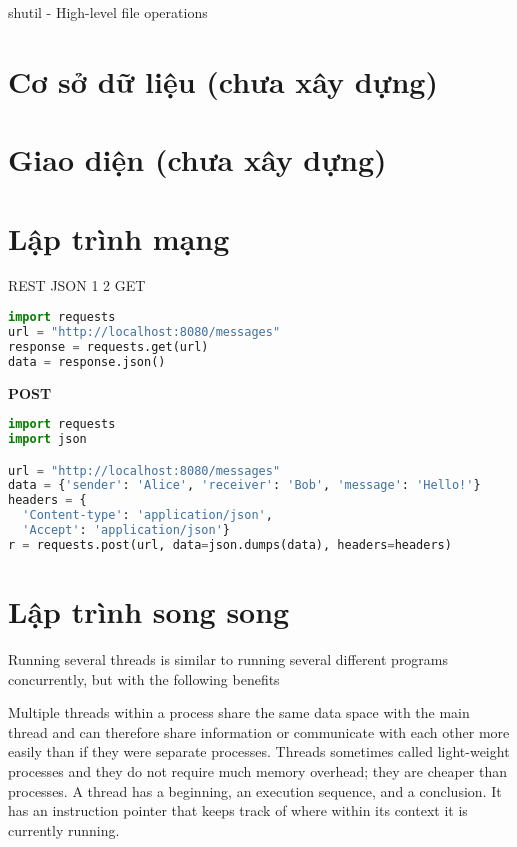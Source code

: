shutil - High-level file operations

\section{Cơ sở dữ liệu (chưa xây dựng)}

\section{Giao diện (chưa xây dựng)}

\section{Lập trình mạng}


REST
JSON 1 2
GET

\begin{lstlisting}[language=Python]
import requests
url = "http://localhost:8080/messages"
response = requests.get(url)
data = response.json()
\end{lstlisting}

\textbf{POST}

\begin{lstlisting}[language=Python]
import requests
import json

url = "http://localhost:8080/messages"
data = {'sender': 'Alice', 'receiver': 'Bob', 'message': 'Hello!'}
headers = {
  'Content-type': 'application/json',
  'Accept': 'application/json'}
r = requests.post(url, data=json.dumps(data), headers=headers)
\end{lstlisting}



\section{Lập trình song song}

Running several threads is similar to running several different programs concurrently, but with the following benefits

Multiple threads within a process share the same data space with the main thread and can therefore share information or communicate with each other more easily than if they were separate processes.
Threads sometimes called light-weight processes and they do not require much memory overhead; they are cheaper than processes.
A thread has a beginning, an execution sequence, and a conclusion. It has an instruction pointer that keeps track of where within its context it is currently running.

